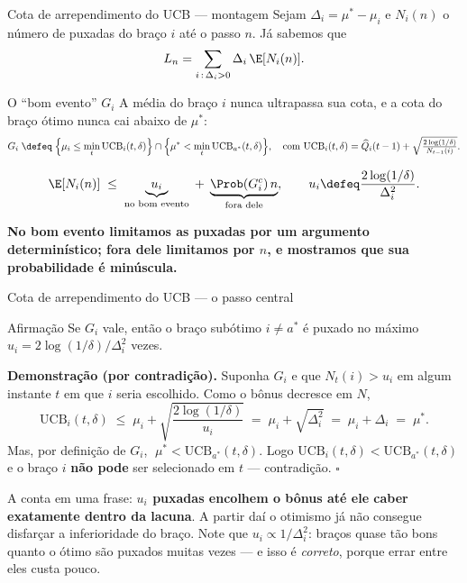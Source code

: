 \documentclass[aspectratio=169, 10pt]{beamer}
\newcommand{\Qhat}{\widehat{Q}}
\newcommand{\Nc}{N}                         %
\newcommand{\gap}{\Delta}
\newcommand{\UCB}{\mathrm{UCB}}
\newcommand{\Reg}{L}
\begin{document}
\begin{frame}{Cota de arrependimento do UCB --- montagem}
  Sejam $\gap_i = \mu^{*} - \mu_i$ e $\Nc_i(n)$ o número de puxadas do
  braço $i$ até o passo $n$. Já sabemos que
  \[
    \Reg_n = \sum_{i \,:\, \gap_i > 0} \gap_i \, \E[\Nc_i(n)].
  \]

  \begin{defbox}{O ``bom evento'' $G_i$}
    A média do braço $i$ nunca ultrapassa sua cota, e a cota do braço ótimo
    nunca cai abaixo de $\mu^{*}$:
    \[
      G_i \;\defeq\; \Bigl\{ \mu_i \le \min_{t} \UCB_i(t, \delta) \Bigr\}
        \cap \Bigl\{ \mu^{*} < \min_t \UCB_{a^{*}}(t, \delta) \Bigr\},
      \quad\text{com } \UCB_i(t,\delta) = \Qhat_i(t-1) + \sqrt{\tfrac{2\log(1/\delta)}{\Nc_{t-1}(i)}}.
    \]
  \end{defbox}

  \vspace{-0.4em}
  \[
    \E[\Nc_i(n)] \;\le\; \underbrace{u_i}_{\text{no bom evento}}
      \;+\; \underbrace{\Prob(G_i^{c})\, n}_{\text{fora dele}},
    \qquad u_i \defeq \frac{2\log(1/\delta)}{\gap_i^2}.
  \]
  \vspace{-0.5em}
  \begin{ideiabox}
    \textbf{No bom evento limitamos as puxadas por um argumento
    determinístico; fora dele limitamos por $n$, e mostramos que sua
    probabilidade é minúscula.}
  \end{ideiabox}
\end{frame}

\begin{frame}{Cota de arrependimento do UCB --- o passo central}
  \begin{teobox}{Afirmação}
    Se $G_i$ vale, então o braço subótimo $i \ne a^{*}$ é puxado no máximo
    $u_i = 2\log(1/\delta)/\gap_i^2$ vezes.
  \end{teobox}

  {\small
  \textbf{Demonstração (por contradição).} Suponha $G_i$ e que
  $\Nc_t(i) > u_i$ em algum instante $t$ em que $i$ seria escolhido. Como o
  bônus decresce em $\Nc$,
  \[
    \UCB_i(t,\delta) \;\le\; \mu_i + \sqrt{\frac{2\log(1/\delta)}{u_i}}
      \;=\; \mu_i + \sqrt{\gap_i^2}
      \;=\; \mu_i + \gap_i \;=\; \mu^{*}.
  \]
  Mas, por definição de $G_i$, $\;\mu^{*} < \UCB_{a^{*}}(t,\delta)$. Logo
  $\UCB_i(t,\delta) < \UCB_{a^{*}}(t,\delta)$ e o braço $i$
  \textbf{não pode} ser selecionado em $t$ --- contradição. \hfill $\square$
  }

  \begin{ideiabox}
    A conta em uma frase: \textbf{$u_i$ puxadas encolhem o bônus até ele
    caber exatamente dentro da lacuna}. A partir daí o otimismo já não
    consegue disfarçar a inferioridade do braço. Note que $u_i \propto
    1/\gap_i^2$: braços quase tão bons quanto o ótimo são puxados muitas
    vezes --- e isso é \emph{correto}, porque errar entre eles custa pouco.
  \end{ideiabox}
\end{frame}
\end{document}

